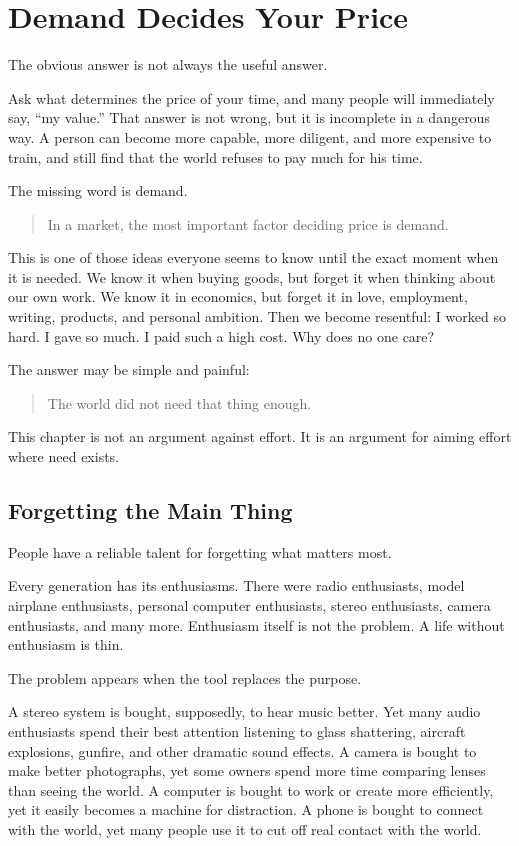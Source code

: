 \chapter{Demand Decides Your Price}

The obvious answer is not always the useful answer.

Ask what determines the price of your time, and many people will immediately say, ``my value.'' That answer is not wrong, but it is incomplete in a dangerous way. A person can become more capable, more diligent, and more expensive to train, and still find that the world refuses to pay much for his time.

The missing word is demand.

\begin{quote}
In a market, the most important factor deciding price is demand.
\end{quote}

This is one of those ideas everyone seems to know until the exact moment when it is needed. We know it when buying goods, but forget it when thinking about our own work. We know it in economics, but forget it in love, employment, writing, products, and personal ambition. Then we become resentful: I worked so hard. I gave so much. I paid such a high cost. Why does no one care?

The answer may be simple and painful:

\begin{quote}
The world did not need that thing enough.
\end{quote}

This chapter is not an argument against effort. It is an argument for aiming effort where need exists.

\section*{Forgetting the Main Thing}

People have a reliable talent for forgetting what matters most.

Every generation has its enthusiasms. There were radio enthusiasts, model airplane enthusiasts, personal computer enthusiasts, stereo enthusiasts, camera enthusiasts, and many more. Enthusiasm itself is not the problem. A life without enthusiasm is thin.

The problem appears when the tool replaces the purpose.

A stereo system is bought, supposedly, to hear music better. Yet many audio enthusiasts spend their best attention listening to glass shattering, aircraft explosions, gunfire, and other dramatic sound effects. A camera is bought to make better photographs, yet some owners spend more time comparing lenses than seeing the world. A computer is bought to work or create more efficiently, yet it easily becomes a machine for distraction. A phone is bought to connect with the world, yet many people use it to cut off real contact with the world.

